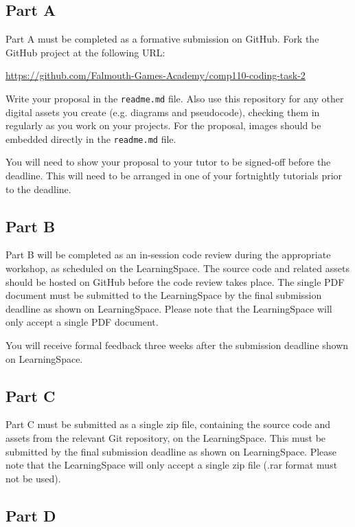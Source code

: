 \documentclass{../fal_assignment}
\begin{document}
\subsection*{Part A}

Part A must be completed as a formative submission on GitHub. Fork the GitHub project at the following URL:

\indent \url{https://github.com/Falmouth-Games-Academy/comp110-coding-task-2}

Write your proposal in the \texttt{readme.md} file. Also use this repository for any other digital assets you create (e.g. diagrams and pseudocode), checking them in regularly as you work on your projects. For the proposal, images should be embedded directly in the \texttt{readme.md} file.

You will need to show your proposal to your tutor to be signed-off before the deadline. This will need to be arranged in one of your fortnightly tutorials prior to the deadline.

\subsection*{Part B}

Part B will be completed as an in-session code review during the appropriate workshop, as scheduled on the LearningSpace. The source code and related assets should be hosted on GitHub before the code review takes place. The single PDF document must be submitted to the LearningSpace by the final submission deadline as shown on LearningSpace. Please note that the LearningSpace will only accept a single PDF document.

You will receive formal feedback three weeks after the submission deadline shown on LearningSpace.

\subsection*{Part C}

Part C must be submitted as a single zip file, containing the source code and assets from the relevant Git repository, on the LearningSpace. This must be submitted by the final submission deadline as shown on LearningSpace. Please note that the LearningSpace will only accept a single zip file (.rar format must not be used).

\subsection*{Part D}
\end{document}
